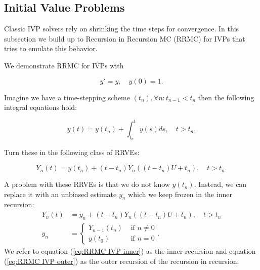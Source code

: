 \documentclass[a4paper,12pt]{article}
\begin{document}

\subsection{Initial Value Problems}
Classic IVP solvers rely on shrinking the time steps for
convergence. In this subsection we build up to
Recursion in Recursion MC (RRMC) for IVPs that tries to emulate
this behavior.


\begin{example}[RRMC $y'=y$] \label{ex:RRMC IVP}
    We demonstrate RRMC for IVPs with

    \begin{equation}
        y' = y, \quad y(0) = 1.
    \end{equation}

    Imagine we have a time-stepping scheme $(t_{n}), \forall n: t_{n-1} < t_{n}$
    then the following integral equations hold:

    \begin{equation}
        y(t)= y(t_{n}) + \int_{t_{n}}^{t}y(s)ds , \quad t>t_{n}.
    \end{equation}

    Turn these in the following class of RRVEs:

    \begin{equation}
        Y_{n}(t) = y(t_{n}) + (t-t_{n})Y_{n}((t-t_{n})U+t_{n}), \quad t>t_{n}.
    \end{equation}

    A problem with these RRVEs is that we do not know $y(t_{n})$.
    Instead, we can replace it with an unbiased estimate $y_{n}$
    which we keep frozen in the inner recursion:
    \begin{align}
        \label{eq:RRMC IVP inner}
        Y_{n}(t) & = y_{n} + (t-t_{n})Y_{n}((t-t_{n})U+t_{n}), \quad t>t_{n} \\
        y_{n}    & = \begin{cases}
                         Y_{n-1}(t_{n}) & \text{ if } n \neq 0 \\
                         y(t_{0})       & \text{ if } n = 0
                     \end{cases}.
        \label{eq:RRMC IVP outer}
    \end{align}
    We refer to equation (\ref{eq:RRMC IVP inner}) as the inner recursion and
    equation (\ref{eq:RRMC IVP outer}) as the outer recursion of the recursion in
    recursion.
\end{example}
\end{document}
